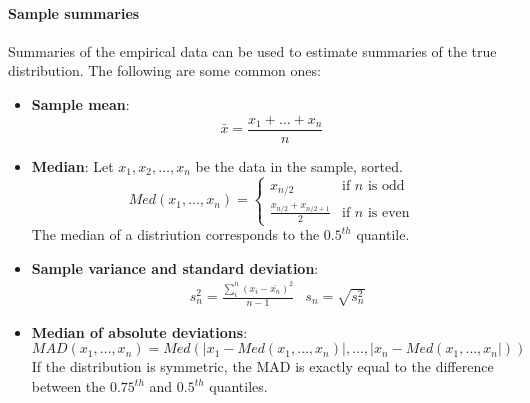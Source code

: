 \paragraph{Sample summaries} Summaries of the empirical data can be used to estimate summaries of the true distribution. The following are some common ones:
\begin{itemize}
    \item \textbf{Sample mean}:
    \begin{equation*}
        \bar{x} = \frac{x_1 + \ldots + x_n}{n}
    \end{equation*}
    \item \textbf{Median}:
    Let $x_1, x_2, \ldots, x_n$ be the data in the sample, sorted.
    \begin{equation*}
        Med(x_1, \ldots, x_n) = \begin{cases}
            x_{n/2} &\text{if } n \text{ is odd}\\
            \frac{x_{n/2} + x_{n/2 + 1}}{2} &\text{if } n \text{ is even} 
        \end{cases}
    \end{equation*}
    The median of a distriution corresponds to the $0.5^{th}$ quantile.
    \item \textbf{Sample variance and standard deviation}:
    \begin{align*}
        &s_n^2 = \frac{\sum_i^n (x_i - \bar{x_n})^2}{n-1} & s_n = \sqrt{s_n^2}
    \end{align*}
    \item \textbf{Median of absolute deviations}:
    \begin{equation*}
        MAD(x_1, \ldots, x_n) = Med(|x_1 - Med(x_1, \ldots, x_n)|, \ldots, |x_n - Med(x_1, \ldots, x_n|))
    \end{equation*}
    If the distribution is symmetric, the MAD is exactly equal to the difference between the $0.75^{th}$ and $0.5^{th}$ quantiles.
\end{itemize}

